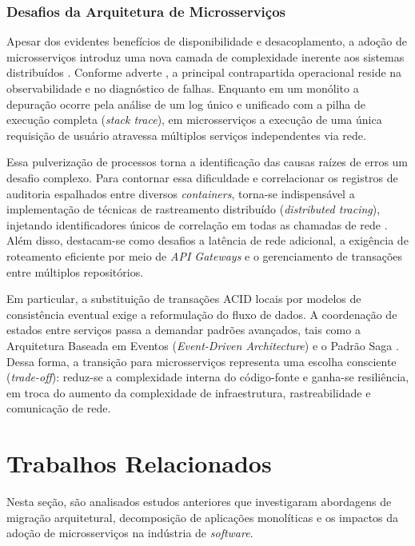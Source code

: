 \subsection{Desafios da Arquitetura de Microsserviços}

Apesar dos evidentes benefícios de disponibilidade e desacoplamento, a adoção de microsserviços introduz uma nova camada de complexidade inerente aos sistemas distribuídos \cite{lewis2014}. Conforme adverte , a principal contrapartida operacional reside na observabilidade e no diagnóstico de falhas. Enquanto em um monólito a depuração ocorre pela análise de um log único e unificado com a pilha de execução completa (\textit{stack trace}), em microsserviços a execução de uma única requisição de usuário atravessa múltiplos serviços independentes via rede.

Essa pulverização de processos torna a identificação das causas raízes de erros um desafio complexo. Para contornar essa dificuldade e correlacionar os registros de auditoria espalhados entre diversos \textit{containers}, torna-se indispensável a implementação de técnicas de rastreamento distribuído (\textit{distributed tracing}), injetando identificadores únicos de correlação em todas as chamadas de rede \cite{richardson2018}. Além disso, destacam-se como desafios a latência de rede adicional, a exigência de roteamento eficiente por meio de \textit{API Gateways} e o gerenciamento de transações entre múltiplos repositórios.

Em particular, a substituição de transações ACID locais por modelos de consistência eventual exige a reformulação do fluxo de dados. A coordenação de estados entre serviços passa a demandar padrões avançados, tais como a Arquitetura Baseada em Eventos (\textit{Event-Driven Architecture}) e o Padrão Saga \cite{richardson2018}. Dessa forma, a transição para microsserviços representa uma escolha consciente (\textit{trade-off}): reduz-se a complexidade interna do código-fonte e ganha-se resiliência, em troca do aumento da complexidade de infraestrutura, rastreabilidade e comunicação de rede.


\chapter{Trabalhos Relacionados}

Nesta seção, são analisados estudos anteriores que investigaram abordagens de migração arquitetural, decomposição de aplicações monolíticas e os impactos da adoção de microsserviços na indústria de \textit{software}.


